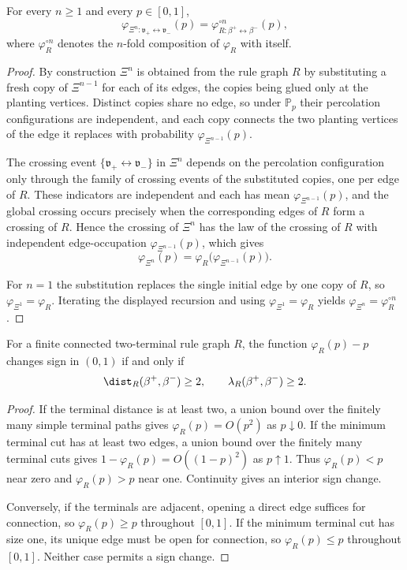 \begin{lemma}\label{lem:renormalisation}
For every $n\ge 1$ and every $p\in[0,1]$,
\[
    \varphi_{\Xi^{n}:\mathfrak v_+\leftrightarrow \mathfrak v_-}(p)
    =
    \varphi_{R:\beta^+\leftrightarrow \beta^-}^{\circ n}(p),
\]
where $\varphi_R^{\circ n}$ denotes the $n$-fold composition of $\varphi_R$ with itself.
\end{lemma}
\begin{proof}
By construction $\Xi^{n}$ is obtained from the rule graph $R$ by substituting a fresh copy of $\Xi^{n-1}$ for each of its edges, the copies being glued only at the planting vertices.
Distinct copies share no edge, so under $\mathbb P_p$ their percolation configurations are independent, and each copy connects the two planting vertices of the edge it replaces with probability $\varphi_{\Xi^{n-1}}(p)$.

The crossing event $\{\mathfrak v_+\leftrightarrow\mathfrak v_-\}$ in $\Xi^{n}$ depends on the percolation configuration only through the family of crossing events of the substituted copies, one per edge of $R$.
These indicators are independent and each has mean $\varphi_{\Xi^{n-1}}(p)$, and the global crossing occurs precisely when the corresponding edges of $R$ form a crossing of $R$.
Hence the crossing of $\Xi^{n}$ has the law of the crossing of $R$ with independent edge-occupation $\varphi_{\Xi^{n-1}}(p)$, which gives
\[
    \varphi_{\Xi^{n}}(p)=\varphi_{R}\bigl(\varphi_{\Xi^{n-1}}(p)\bigr).
\]

For $n=1$ the substitution replaces the single initial edge by one copy of $R$, so $\varphi_{\Xi^{1}}=\varphi_R$.
Iterating the displayed recursion and using $\varphi_{\Xi^{1}}=\varphi_R$ yields $\varphi_{\Xi^{n}}=\varphi_R^{\circ n}$.
\end{proof}



\begin{proposition}\label{prop:nontrivial-transition}
For a finite connected two-terminal rule graph $R$, the function $\varphi_R(p)-p$ changes sign in $(0,1)$ if and only if
\[
 \dist_R(\beta^+,\beta^-)\ge2,
 \qquad \lambda_R(\beta^+,\beta^-)\ge2.
\]
\end{proposition}
\begin{proof}
If the terminal distance is at least two, a union bound over the finitely many simple terminal paths gives $\varphi_R(p)=O(p^2)$ as $p\downarrow0$.
If the minimum terminal cut has at least two edges, a union bound over the finitely many terminal cuts gives $1-\varphi_R(p)=O((1-p)^2)$ as $p\uparrow1$.
Thus $\varphi_R(p)<p$ near zero and $\varphi_R(p)>p$ near one.
Continuity gives an interior sign change.

Conversely, if the terminals are adjacent, opening a direct edge suffices for connection, so $\varphi_R(p)\ge p$ throughout $[0,1]$.
If the minimum terminal cut has size one, its unique edge must be open for connection, so $\varphi_R(p)\le p$ throughout $[0,1]$.
Neither case permits a sign change.
\end{proof}


